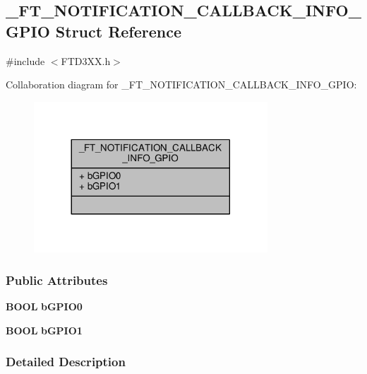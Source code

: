 \subsection{\+\_\+\+F\+T\+\_\+\+N\+O\+T\+I\+F\+I\+C\+A\+T\+I\+O\+N\+\_\+\+C\+A\+L\+L\+B\+A\+C\+K\+\_\+\+I\+N\+F\+O\+\_\+\+G\+P\+IO Struct Reference}
\label{struct__FT__NOTIFICATION__CALLBACK__INFO__GPIO}


{\ttfamily \#include $<$F\+T\+D3\+X\+X.\+h$>$}



Collaboration diagram for \+\_\+\+F\+T\+\_\+\+N\+O\+T\+I\+F\+I\+C\+A\+T\+I\+O\+N\+\_\+\+C\+A\+L\+L\+B\+A\+C\+K\+\_\+\+I\+N\+F\+O\+\_\+\+G\+P\+IO\+:
\nopagebreak
\begin{figure}[H]
\begin{center}
\leavevmode
\includegraphics[width=248pt]{d0/d02/struct__FT__NOTIFICATION__CALLBACK__INFO__GPIO__coll__graph}
\end{center}
\end{figure}
\subsubsection*{Public Attributes}
\begin{DoxyCompactItemize}
\item 
{\bf B\+O\+OL} {\bf b\+G\+P\+I\+O0}
\item 
{\bf B\+O\+OL} {\bf b\+G\+P\+I\+O1}
\end{DoxyCompactItemize}


\subsubsection{Detailed Description}


